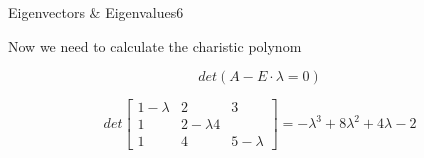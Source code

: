 \begin{questions}
\begin{question}{Eigenvectors \& Eigenvalues}{6}
\begin{answer}
Now we need to calculate the charistic polynom

\begin{equation}
	det(A-E\cdot \lambda = 0)
\end{equation}

\begin{equation}
	det
	\begin{bmatrix}
	1-\lambda & 2 & 3 \\
	1 & 2-\lambda 4 \\
	1 & 4 & 5-\lambda
	\end{bmatrix}
	= -\lambda^3 + 8 \lambda^2 + 4\lambda - 2
\end{equation}

\end{answer}

\end{question}


\end{questions}
